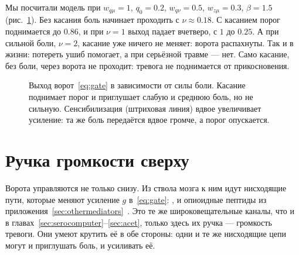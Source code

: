 Мы посчитали модель при $w_{q\mu}=1$, $q_0=0.2$, $w_{q\nu}=0.5$, $w_{z\mu}=0.3$, $\beta=1.5$ (рис.~\ref{fig:gatecurves}). Без касания боль начинает проходить с $\nu\approx0.18$. С касанием порог поднимается до $0.86$, и при $\nu=1$ выход падает вчетверо, с $1$ до $0.25$. А при сильной боли, $\nu=2$, касание уже ничего не меняет: ворота распахнуты. Так и в жизни: потереть ушиб помогает, а при серьёзной травме --- нет. Само касание, без боли, через ворота не проходит: тревога не поднимается от прикосновения.

\begin{figure}[t]
\centering
{}
\caption{Выход ворот~\eqref{eq:gate} в зависимости от силы боли. Касание поднимает порог и приглушает слабую и среднюю боль, но не сильную. Сенсибилизация (штриховая линия) вдвое увеличивает усиление: та же боль передаётся вдвое громче, а порог опускается.}
\label{fig:gatecurves}
\end{figure}

\section{Ручка громкости сверху}

Ворота управляются не только снизу. Из ствола мозга к ним идут нисходящие пути, которые меняют усиление $g$ в~\eqref{eq:gate}: ,  и опиоидные пептиды из приложения~\ref{sec:othermediators}~\cite{Fields2004}. Это те же широковещательные каналы, что и в главах~\ref{sec:serocomputer}--\ref{sec:acet}, только здесь их ручка --- громкость тревоги. Они умеют крутить её в обе стороны: одни и те же нисходящие цепи могут и приглушать боль, и усиливать её.

